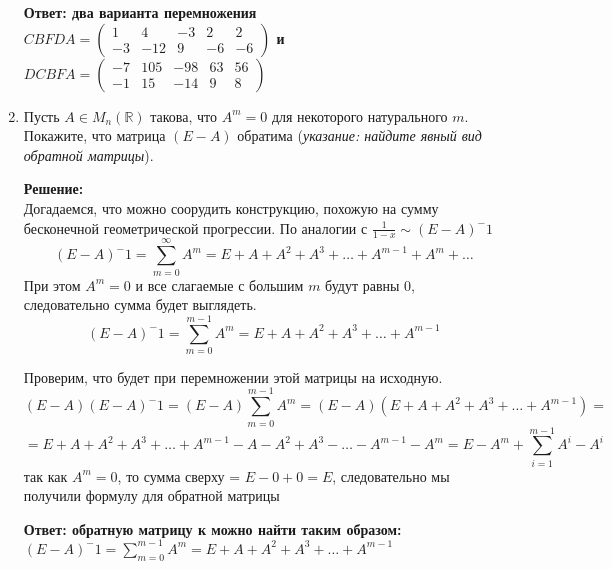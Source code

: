 \documentclass[a4paper,12pt]{article}
\begin{document}
\begin{enumerate}
\textbf{Ответ: два варианта перемножения $CBFDA = \begin{pmatrix}
1 & 4 & -3 & 2 & 2\\
-3 & -12 & 9 & -6 & -6
\end{pmatrix}$ и $DCBFA = \begin{pmatrix}
-7 & 105 & -98 & 63 & 56\\
-1 & 15 & -14 & 9 & 8
\end{pmatrix}$}

\vspace{5pt}

\item Пусть $A\in M_n(\mathbb{R})$ такова, что $A^m = 0$ для некоторого натурального $m$. Покажите, что матрица $(E - A)$ обратима ({\it указание: найдите явный вид обратной матрицы}).

\textbf{Решение:}\\
Догадаемся, что можно соорудить конструкцию, похожую на сумму бесконечной геометрической прогрессии. По аналогии с $\frac{1}{1-x} \sim (E-A)^-1$
$$(E-A)^-1=\sum^{\infty}_{m=0}A^m=E+A+A^2 + A^3+\ldots + A^{m-1}+A^{m}+\ldots $$
При этом $A^m = 0$ и все слагаемые с большим $m$ будут равны 0, следовательно сумма будет выглядеть.
$$(E-A)^-1=\sum^{m-1}_{m=0}A^m=E+A+A^2 + A^3+\ldots + A^{m-1}$$

Проверим, что будет при перемножении этой матрицы на исходную.
$$(E-A)(E-A)^-1=(E-A)\sum^{m-1}_{m=0}A^m=(E-A)(E+A+A^2 + A^3+\ldots + A^{m-1})=$$$$=E+A+A^2 + A^3+\ldots + A^{m-1}-A-A^2 + A^3-\ldots - A^{m-1}-A^{m} = E-A^m + \sum_{i=1}^{m-1}{A^i-A^i}$$
так как $A^m = 0$, то сумма сверху = $E-0+0=E$, следовательно мы получили формулу для обратной матрицы

\textbf{Ответ: обратную матрицу к можно найти таким образом: $(E-A)^-1=\sum^{m-1}_{m=0}A^m=E+A+A^2 + A^3+\ldots + A^{m-1}$}

\vspace{5pt}


\end{enumerate}
\end{document}
